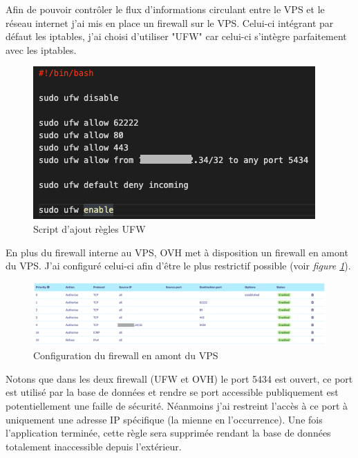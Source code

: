 \newparasm
\begin{minipage}{.5\textwidth}
  Afin de pouvoir contrôler le flux d'informations circulant entre le VPS et le réseau internet j'ai mis en place un firewall sur le VPS. Celui-ci intégrant par défaut les iptables\footnotemark, j'ai choisi d'utiliser "UFW" car celui-ci s'intègre parfaitement avec les iptables.  
\end{minipage}
\begin{minipage}{.5\textwidth}
  \begin{figure}[H]
    \centering
    \includegraphics[width=0.8\linewidth]{img/ufw-script.png}
    \caption{Script d'ajout règles UFW}
  \end{figure}
\end{minipage}


\newparasm
En plus du firewall interne au VPS, OVH met à disposition un firewall en amont du VPS. J'ai configuré celui-ci afin d'être le plus restrictif possible (voir \textit{figure \ref{VPS-firewall}}).
\begin{figure}[H]
  \centering
  \includegraphics[width=\linewidth]{img/ovh-fireWall.png}
  \caption{Configuration du firewall en amont du VPS}
  \label{VPS-firewall}
\end{figure}

\newpara
\newpara

Notons que dans les deux firewall (UFW et OVH) le port 5434 est ouvert, ce port est utilisé par la base de données et rendre se port accessible publiquement est potentiellement une faille de sécurité. Néanmoins j'ai restreint l'accès à ce port à uniquement une adresse IP spécifique (la mienne en l'occurrence). Une fois l'application terminée, cette règle sera supprimée rendant la base de données totalement inaccessible depuis l'extérieur. 


